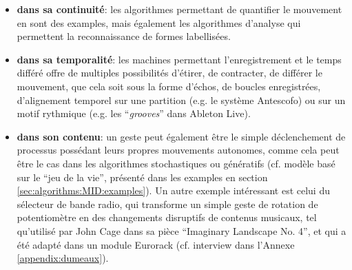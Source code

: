 \begin{itemize}[noitemsep]
	\item \textbf{dans sa continuité}: les algorithmes permettant de quantifier le mouvement en sont des examples, mais également les algorithmes d'analyse qui permettent la reconnaissance de formes labellisées.
	
	\item \textbf{dans sa temporalité}: les machines permettant l'enregistrement et le temps différé offre de multiples possibilités d'étirer, de contracter, de différer le mouvement, que cela soit sous la forme d'échos, de boucles enregistrées, d'alignement temporel sur une partition (e.g. le système Antescofo) ou sur un motif rythmique (e.g. les ``\textit{grooves}'' dans Ableton Live).

	\item \textbf{dans son contenu}: un geste peut également être le simple déclenchement de processus possédant leurs propres mouvements autonomes, comme cela peut être le cas dans les algorithmes stochastiques ou génératifs (cf. modèle basé sur le ``jeu de la vie'', présenté dans les examples en section \ref{sec:algorithms:MID:examples}). Un autre exemple intéressant est celui du sélecteur de bande radio, qui transforme un simple geste de rotation de potentiomètre en des changements disruptifs de contenus musicaux, tel qu'utilisé par John Cage dans sa pièce ``Imaginary Landscape No. 4'', et qui a été adapté dans un module Eurorack (cf. interview dans l'Annexe \ref{appendix:dumeaux}).

\end{itemize}


